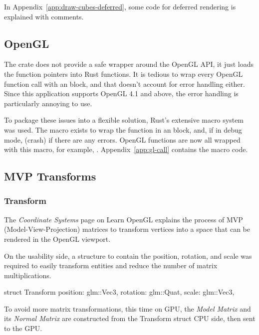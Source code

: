 In Appendix~\ref{app:draw-cubes-deferred}, some code for deferred rendering is explained with comments.

\subsection{OpenGL}

The  crate does not provide a safe wrapper around the OpenGL API, it just loads the function pointers into Rust functions.
It is tedious to wrap every OpenGL function call with an  block, and that doesn't account for error handling either.
Since this application supports OpenGL 4.1 and above, the error handling is particularly annoying to use.

To package these issues into a flexible solution, Rust's extensive macro system was used.
The  macro exists to wrap the function in an  block, and, if in debug mode,  (crash) if there are any errors.
OpenGL functions are now all wrapped with this macro, for example, .
Appendix~\ref{app:gl-call} contains the macro code.

\subsection{MVP Transforms}

\subsubsection{Transform}
The \emph{Coordinate Systems} page on Learn OpenGL\autocite{de_vries_learn_2020} explains the process of MVP (Model-View-Projection) matrices to transform vertices into a space that can be rendered in the OpenGL viewport.

On the usability side, a structure to contain the position, rotation, and scale was required to easily transform entities and reduce the number of matrix multiplications.
  \begin{rustcode}
struct Transform {
    position: glm::Vec3,
    rotation: glm::Quat,
    scale: glm::Vec3,
}
  \end{rustcode}
To avoid more matrix transformations, this time on GPU, the \emph{Model Matrix} and its \emph{Normal Matrix} are constructed from the Transform struct CPU side, then sent to the GPU\@.


